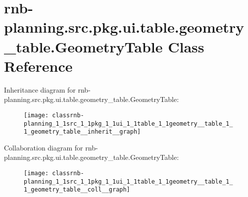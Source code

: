 \hypertarget{classrnb-planning_1_1src_1_1pkg_1_1ui_1_1table_1_1geometry__table_1_1_geometry_table}{}\section{rnb-\/planning.src.\+pkg.\+ui.\+table.\+geometry\+\_\+table.\+Geometry\+Table Class Reference}
\label{classrnb-planning_1_1src_1_1pkg_1_1ui_1_1table_1_1geometry__table_1_1_geometry_table}


Inheritance diagram for rnb-\/planning.src.\+pkg.\+ui.\+table.\+geometry\+\_\+table.\+Geometry\+Table\+:
\nopagebreak
\begin{figure}[H]
\begin{center}
\leavevmode
\texttt{[image: classrnb-planning\_1\_1src\_1\_1pkg\_1\_1ui\_1\_1table\_1\_1geometry\_\_table\_1\_1\_geometry\_table\_\_inherit\_\_graph]}
\end{center}
\end{figure}


Collaboration diagram for rnb-\/planning.src.\+pkg.\+ui.\+table.\+geometry\+\_\+table.\+Geometry\+Table\+:
\nopagebreak
\begin{figure}[H]
\begin{center}
\leavevmode
\texttt{[image: classrnb-planning\_1\_1src\_1\_1pkg\_1\_1ui\_1\_1table\_1\_1geometry\_\_table\_1\_1\_geometry\_table\_\_coll\_\_graph]}
\end{center}
\end{figure}
